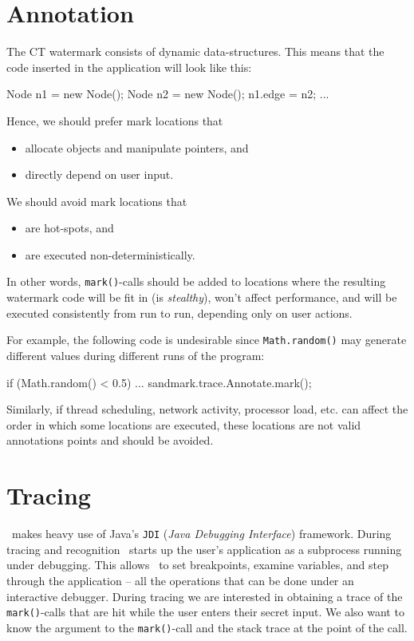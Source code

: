 \section{Annotation}
The {\sf CT} watermark consists of dynamic data-structures.
This means that the code inserted in the application will look 
like this:
\begin{listing}{1}
   Node n1 = new Node();
   Node n2 = new Node();
   n1.edge = n2;
   ...
\end{listing}
Hence, we should prefer mark locations that
\begin{itemize}
    \item allocate objects and manipulate pointers, and
    \item directly depend on user input.
\end{itemize}
We should avoid mark locations that
\begin{itemize}
    \item are hot-spots, and
    \item are executed non-deterministically.
\end{itemize}
In other words, {\tt mark()}-calls should be added
to locations where the resulting watermark code
will be fit in (is {\em stealthy}), won't affect performance,
and will be executed consistently from run to run,
depending only on user actions.

For example, the following code is undesirable
since {\tt Math.random()} may generate different
values during different runs of the program:
\begin{listing}{1}
   if (Math.random() < 0.5) {
      ...
      sandmark.trace.Annotate.mark();
   }
\end{listing}
Similarly, if thread scheduling, network activity, 
processor load, etc. can affect the order in
which some locations are executed, these locations are
not valid annotations points and should be avoided.


\section{Tracing}
\SM\ makes heavy use of Java's {\tt JDI} ({\em Java Debugging
Interface}) framework. During tracing and recognition \SM\
starts up the user's application as a subprocess running under
debugging. This allows \SM\ to set breakpoints, examine variables,
and step through the application -- all the operations that 
can be done under an interactive debugger. During tracing we
are interested in obtaining a trace of the {\tt mark()}-calls that are
hit while the user enters their secret input. We also want
to know the argument to the {\tt mark()}-call and the stack
trace at the point of the call.

